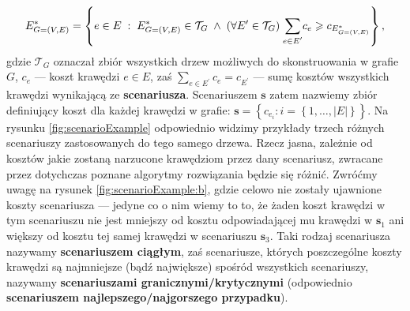 \begin{equation}
	E^{\ast}_{G = \left( V, E \right)} = \left\{ e \in E \; : \; E^{\ast}_{G = \left( V, E \right)} \in \mathcal{T}_{G} \; \wedge \; \left( \forall E^{\prime} \in \mathcal{T}_{G} \right) \; \sum_{ \mathclap{e \in E^{\prime} }} c_{e} \geqslant c_{ E^{\ast}_{ G = \left( V, E \right) } } \right\}\text{,}
\end{equation}
gdzie $\mathcal{T}_{G}$ oznaczał zbiór wszystkich drzew możliwych do skonstruowania w grafie $G$, $c_{e}$ --- koszt krawędzi $e \in E$, zaś $\sum_{ e \in E^{\prime} } c_{e} = c_{E^{\prime}}$ --- sumę kosztów wszystkich krawędzi wynikającą ze \textbf{scenariusza}. Scenariuszem $\textbf{s}$ zatem nazwiemy zbiór definiujący koszt dla każdej krawędzi w grafie: $\textbf{s} = \left\{ c_{e_{i}} : i = \left\{ 1, \dots, \left| E \right| \right\} \right\}$. Na rysunku \ref{fig:scenarioExample} odpowiednio widzimy przykłady trzech różnych scenariuszy zastosowanych do tego samego drzewa. Rzecz jasna, zależnie od kosztów jakie zostaną narzucone krawędziom przez dany scenariusz, zwracane przez dotychczas poznane algorytmy rozwiązania będzie się różnić. Zwróćmy uwagę na rysunek \ref{fig:scenarioExample:b}, gdzie celowo nie zostały ujawnione koszty scenariusza --- jedyne co o nim wiemy to to, że żaden koszt krawędzi w tym scenariuszu nie jest mniejszy od kosztu odpowiadającej mu krawędzi w $\textbf{s}_{1}$ ani większy od kosztu tej samej krawędzi w scenariuszu $\textbf{s}_{3}$. Taki rodzaj scenariusza nazywamy \textbf{scenariuszem ciągłym}, zaś scenariusze, których poszczególne koszty krawędzi są najmniejsze (bądź największe) spośród wszystkich scenariuszy, nazywamy \textbf{scenariuszami granicznymi/krytycznymi} (odpowiednio \textbf{scenariuszem najlepszego/najgorszego przypadku}).

